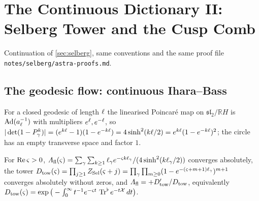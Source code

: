
\section{The Continuous Dictionary II: Selberg Tower and the Cusp Comb}
\label{sec:selberg-tower}

Continuation of \cref{sec:selberg}, same conventions and the same proof
file \texttt{notes/selberg/astra-proofs.md}.

\subsection{The geodesic flow: continuous Ihara--Bass}

\begin{proposition}
\label{prop:poincare-jacobian}
For a closed geodesic of length $\ell$ the linearised Poincar\'e map on
$\mathfrak{sl}_2/\mathbb RH$ is $\operatorname{Ad}(a_\ell^{-1})$ with
multipliers $e^{\ell}, e^{-\ell}$, so $|\det(1-P_{\gamma}^k)| =
(e^{k\ell}-1)(1-e^{-k\ell}) = 4\sinh^2(k\ell/2) = e^{k\ell}(1-e^{-k\ell})^2$; the
circle has an empty transverse space and factor $1$.
\end{proposition}

\begin{proposition}
\label{prop:flat-tower}
For $\operatorname{Re}\varsigma>0$, $\varLambda_{\mathrm{fl}}(\varsigma) = \sum_\gamma\sum_{k\ge1}\ell_\gamma
e^{-\varsigma k\ell_\gamma}/(4\sinh^2(k\ell_\gamma/2))$ converges absolutely, the
tower $D_{\mathrm{tow}}(\varsigma) = \prod_{j\ge1}Z_{\mathrm{Sel}}(\varsigma+j) =
\prod_\gamma\prod_{m\ge0}(1-e^{-(\varsigma+m+1)\ell_\gamma})^{m+1}$ converges
absolutely without zeros, and
$\varLambda_{\mathrm{fl}} = +D_{\mathrm{tow}}'/D_{\mathrm{tow}}$, equivalently $D_{\mathrm{tow}}(\varsigma) =
\exp\big(-\int_0^\infty t^{-1}e^{-\varsigma t}\,\operatorname{Tr}^{\flat} e^{-t\mathcal X}\,dt\big)$.
\end{proposition}

